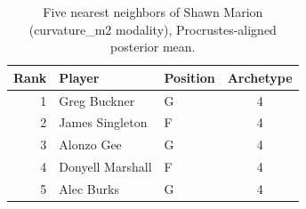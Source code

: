 \begin{table}[htbp]
  \centering\small
  \begin{tabular}{rllc}
    \toprule
    Rank & Player & Position & Archetype \\
    \midrule
    1 & Greg Buckner & G & 4 \\
    2 & James Singleton & F & 4 \\
    3 & Alonzo Gee & G & 4 \\
    4 & Donyell Marshall & F & 4 \\
    5 & Alec Burks & G & 4 \\
    \bottomrule
  \end{tabular}
  \caption{Five nearest neighbors of Shawn Marion (curvature_m2 modality), Procrustes-aligned posterior mean.}
  \label{tab:Shawn_Marion_neighbors_curvature_m2}
\end{table}

